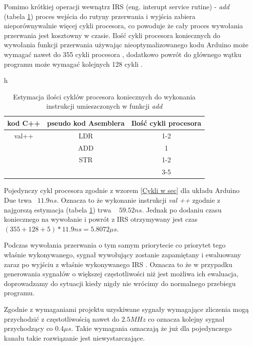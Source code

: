 \documentclass[a4paper,12pt]{article}
\begin{document}
Pomimo krótkiej operacji wewnątrz IRS (eng. interupt service rutine) - \textit{add} (tabela \ref{decompile add}) proces wejścia do rutyny przerwania i wyjścia zabiera nieporównywalnie więcej cykli procesora, co powoduje że cały proces wywołania przerwania jest kosztowny w czasie. 
Ilość cykli procesora koniecznych do wywołania funkcji przerwania używając nieoptymalizowanego kodu Arduino może wymagać nawet do 355 cykli procesora \cite{ard_opt_git}, dodatkowo powrót do głównego wątku programu może wymagać kolejnych 128 cykli \cite{ard_opt_git}.

\begin{table}{h}
        \begin{center}
        \caption{Estymacja ilości cyklów procesora koniecznych do wykonania instrukcji umieszczonych w funkcji \textit{add} }
        \label{decompile add}
        \begin{tabular}{c|c|c}
                kod C++ & pseudo kod Asemblera & Ilość cykli procesora \cite{cycles} \\ \hline
                val++ & LDR & 1-2 \\
                        & ADD & 1 \\
                        & STR & 1-2 \\ 
                        \hline \hline
                        &   &  3-5 
        \end{tabular}
        \end{center}
\end{table}

Pojedynczy cykl procesora zgodnie z wzorem \ref{Cykli w sec} dla układu Arduino Due trwa ~$ 11.9 ns $. 
Oznacza to że wykonanie instrukcji \textit{val ++} zgodnie z najgorszą estymacja (tabela \ref{decompile add}) trwa ~ $59.52 ns$. 
Jednak po dodaniu czasu koniecznego na wywołanie i powrót z IRS otrzymywany jest czas $ (355 + 128 + 5) * 11.9 ns =  5.8072 \mu s $. 

Podczas wywołania przerwania o tym samym priorytecie co priorytet tego właśnie wykonywanego, sygnał wywołujący zostanie zapamiętany i ewaluowany zaraz po wyjściu z właśnie wykonywanego IRS  \cite{datasheet}. 
Oznacza to że w przypadku generowania sygnałów o większej częstotliwości niż jest możliwa ich ewaluacja, doprowadzamy do sytuacji kiedy nigdy nie wrócimy do normalnego przebiegu programu. 

Zgodnie z wymaganiami projektu uzyskiwane sygnały wymagające zliczenia mogą przychodzić z częstotliwością nawet do $2.5MHz$ co oznacza kolejny sygnał przychodzący co $0.4\mu s$.
Takie wymagania oznaczają że już dla pojedynczego kanału takie rozwiązanie jest niewystarczające. 
\end{document}

